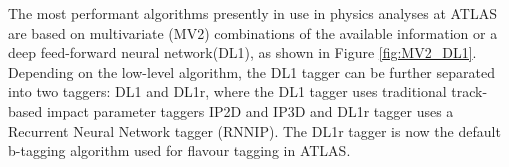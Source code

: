 \documentclass[letterpaper,12pt]{article}
\begin{document}

The most performant algorithms presently in use in physics analyses at ATLAS are based on multivariate (MV2) combinations of the available information or a deep feed-forward neural network(DL1)\cite{tagging}\cite{ATL-PHYS-PUB-2017-013}, as shown in Figure \ref{fig:MV2_DL1}. Depending on the low-level algorithm, the DL1 tagger can be further separated into two taggers: DL1 and DL1r, where the DL1 tagger uses traditional track-based impact parameter taggers IP2D and IP3D and DL1r tagger uses a Recurrent Neural Network tagger (RNNIP)\cite{ATL-PHYS-PUB-2017-013}. The DL1r tagger is now the default b-tagging algorithm used for flavour tagging in ATLAS.
\end{document}
